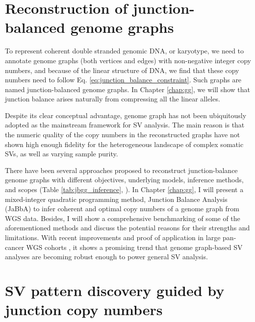 \documentclass[phd,tocprelim]{cornell}
\begin{document}
\section{Reconstruction of junction-balanced genome graphs}
To represent coherent double stranded genomic DNA, or karyotype, we need to annotate genome graphs (both vertices and edges) with non-negative integer copy numbers, and because of the linear structure of DNA, we find that these copy numbers need to follow Eq. \ref{eq:junction_balance_constraint}. Such graphs are named junction-balanced genome graphs. In Chapter \ref{chap:gg}, we will show that junction balance arises naturally from compressing all the linear alleles.

Despite its clear conceptual advantage, genome graph has not been ubiquitously adopted as the mainstream framework for SV analysis. The main reason is that the numeric quality of the copy numbers in the reconstructed graphs have not shown high enough fidelity for the heterogeneous landscape of complex somatic SVs, as well as varying sample purity. 

There have been several approaches proposed to reconstruct junction-balance genome graphs with different objectives, underlying models, inference methods, and scopes (Table \ref{tab:jbgg_inference}, \cite{Oesper2012-vw,McPherson2017-ry,Li2016-qa,Dzamba2017-wo,Deshpande2019-gs,Li2020-ds,Lee2021-rl,Aganezov2019-yh}). In Chapter \ref{chap:gg}, I will present a mixed-integer quadratic programming method, Junction Balance Analysis (JaBbA) to infer coherent and optimal copy numbers of a genome graph from WGS data. Besides, I will show a comprehensive benchmarking of some of the aforementioned methods and discuss the potential reasons for their strengths and limitations. With recent improvements and proof of application in large pan-cancer WGS cohorts \cite{Hadi2020-um}, it shows a promising trend that genome graph-based SV analyses are becoming robust enough to power general SV analysis.

\section{SV pattern discovery guided by junction copy numbers}
\end{document}
